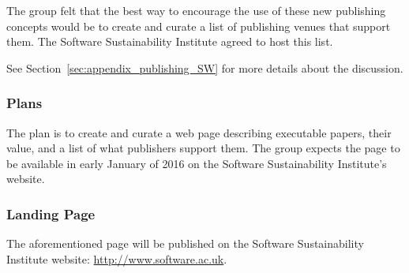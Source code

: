 The group felt that the best way to encourage the use of these new publishing
concepts would be to create and curate a list of publishing venues that
support them. The Software Sustainability Institute agreed to host this list.

See Section~\ref{sec:appendix_publishing_SW} for more details about the
discussion.

\subsubsection{Plans}

The plan is to create and curate a web page describing executable papers, their value, and
a list of what publishers support them. The group expects the page to be available in
early January of 2016 on the Software Sustainability Institute's website.

\subsubsection{Landing Page}

The aforementioned page will be published on the Software Sustainability
Institute website: \url{http://www.software.ac.uk}.
